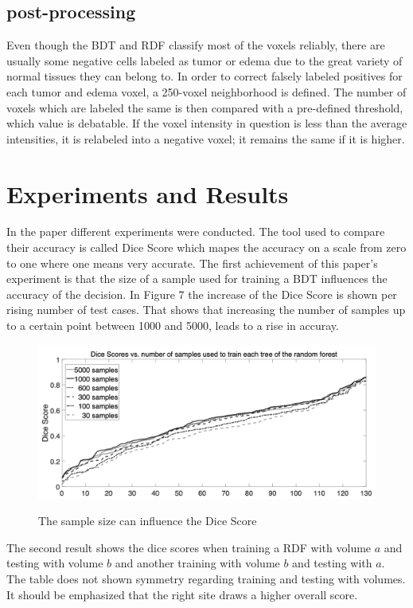 \documentclass[
12pt,
headsepline,
bibliography=totoc,
twoside=semi,
fleqn
]{scrartcl}
\begin{document}
 \subsection{post-processing\label{sec:sec3-4}}
 Even though the BDT and RDF classify most of the voxels reliably, there are usually some negative cells labeled as tumor or edema due to the great variety of normal tissues they can belong to. In order to correct falsely labeled positives for each tumor and edema voxel, a 250-voxel neighborhood is defined. The number of voxels which are labeled the same is then compared with a pre-defined threshold, which value is debatable. If the voxel intensity in question is less than the average intensities, it is relabeled into a negative voxel; it remains the same if it is higher.

\section{Experiments and Results\label{sec:sec4}}

 In the paper different experiments were conducted. The tool used to compare their accuracy is called Dice Score which mapes the accuracy on a scale from zero to one where one means very accurate. 
 The first achievement of this paper's experiment is that the size of a sample used for training a BDT influences the accuracy of the decision. In Figure 7 the increase of the Dice Score is shown per rising number of test cases. That shows that increasing the number of samples up to a certain point between 1000 and 5000, leads to a rise in accuray.
 
 \begin{figure}[H]
 \centering \includegraphics[scale=0.5]{BDT16.png}\label{fig:test}
 \caption{The sample size can influence the Dice Score}
 \end{figure} 

 The second result shows the dice scores when training a RDF with volume $a$ and testing with volume $b$ and another training with volume $b$ and testing with $a$. The table does not shown symmetry regarding training and testing with volumes. It should be emphasized that the right site draws a higher overall score. 
\end{document}
